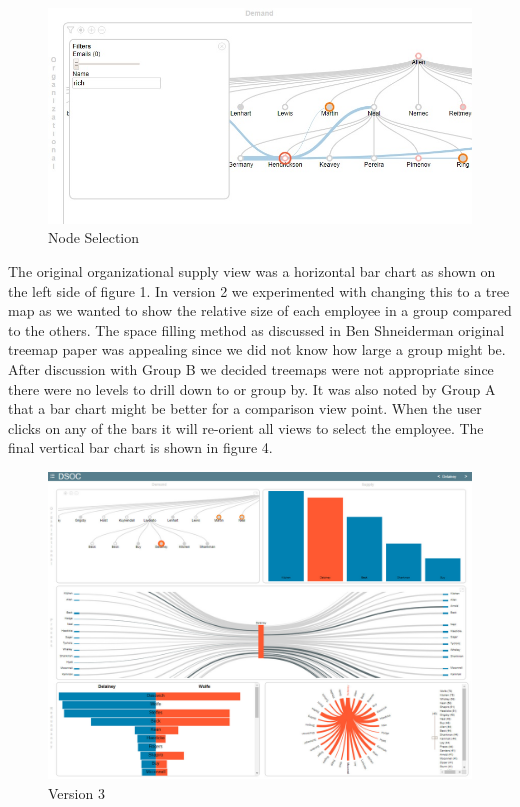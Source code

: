 \documentclass[journal]{vgtc}                %
\begin{document}
\begin{figure}
	\centering
	\includegraphics[width=\columnwidth]{pictures/orgdemand.jpg}
	\caption{Node Selection}
	\label{fig:global}
\end{figure}

The original organizational supply view was a horizontal bar chart as shown on the left side of figure 1.  In version 2 we experimented with changing this to a tree map as we wanted to show the relative size of each employee in a group compared to the others.  The space filling method\cite{shneiderman1992tree} as discussed in Ben Shneiderman original treemap paper was appealing since we did not know how large a group might be.  After discussion with Group B we decided treemaps were not appropriate since there were no levels to drill down to or group by.  It was also noted by Group A that a bar chart might be better for a comparison view point.  When the user clicks on any of the bars it will re-orient all views to select the employee.  The final vertical bar chart is shown in figure 4.

\begin{figure}
	\centering
	\includegraphics[width=\columnwidth]{pictures/version3.jpg}
	\caption{Version 3}
	\label{fig:global}
\end{figure}
\end{document}
